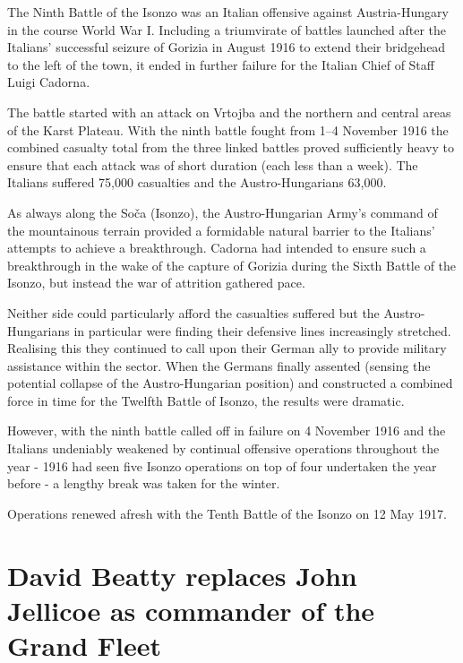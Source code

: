 \documentclass[a4paper,]{book}
\begin{document}
The Ninth Battle of the Isonzo was an Italian offensive against Austria-Hungary in the course World War I. Including a triumvirate of battles launched after the Italians' successful seizure of Gorizia in August 1916 to extend their bridgehead to the left of the town, it ended in further failure for the Italian Chief of Staff Luigi Cadorna.

The battle started with an attack on Vrtojba and the northern and central areas of the Karst Plateau. With the ninth battle fought from 1–4 November 1916 the combined casualty total from the three linked battles proved sufficiently heavy to ensure that each attack was of short duration (each less than a week). The Italians suffered 75,000 casualties and the Austro-Hungarians 63,000.

As always along the Soča (Isonzo), the Austro-Hungarian Army's command of the mountainous terrain provided a formidable natural barrier to the Italians' attempts to achieve a breakthrough. Cadorna had intended to ensure such a breakthrough in the wake of the capture of Gorizia during the Sixth Battle of the Isonzo, but instead the war of attrition gathered pace.

Neither side could particularly afford the casualties suffered but the Austro-Hungarians in particular were finding their defensive lines increasingly stretched. Realising this they continued to call upon their German ally to provide military assistance within the sector. When the Germans finally assented (sensing the potential collapse of the Austro-Hungarian position) and constructed a combined force in time for the Twelfth Battle of Isonzo, the results were dramatic.

However, with the ninth battle called off in failure on 4 November 1916 and the Italians undeniably weakened by continual offensive operations throughout the year - 1916 had seen five Isonzo operations on top of four undertaken the year before - a lengthy break was taken for the winter.

Operations renewed afresh with the Tenth Battle of the Isonzo on 12 May 1917. 

\section{David Beatty replaces John Jellicoe as commander of the Grand Fleet}
\end{document}
